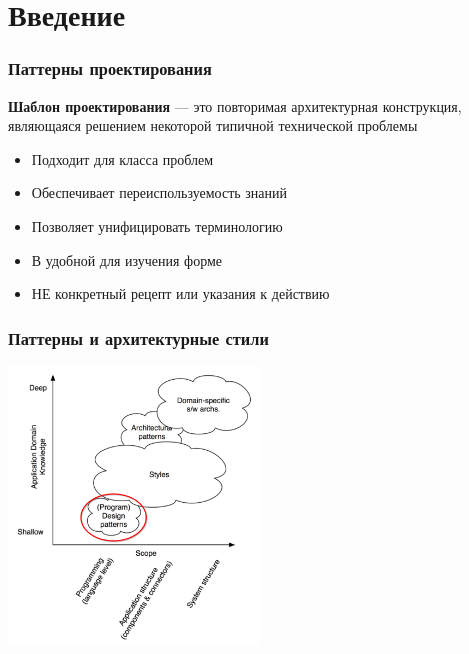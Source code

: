 \documentclass{../cscslides}
\begin{document}
    \frame{\titlepage}

    \section{Введение}

    \begin{frame}
        \frametitle{Паттерны проектирования}
        \textbf{Шаблон проектирования} --- это повторимая архитектурная конструкция, являющаяся решением некоторой типичной технической проблемы
        \begin{itemize}
            \item Подходит для класса проблем
            \item Обеспечивает переиспользуемость знаний
            \item Позволяет унифицировать терминологию
            \item В удобной для изучения форме
            \item НЕ конкретный рецепт или указания к действию
        \end{itemize}
    \end{frame}

    \begin{frame}
        \frametitle{Паттерны и архитектурные стили}
        \begin{center}
            \includegraphics[width=0.5\textwidth]{architecturalStylesPatternsHighlighted.png}
        \end{center}
    \end{frame}
\end{document}
